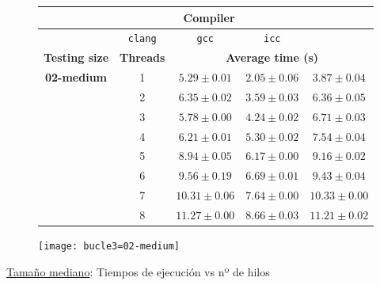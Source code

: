 \begin{figure}[H]
    \centering
    \begin{subfigure}{0.4\textwidth}
        \begin{adjustbox}{width=\textwidth} 
        \begin{tabular}{|c|c|c|c|c|}
            \hline
            \rowcolor{azul} \multicolumn{2}{|c|}{}&\multicolumn{3}{c|}{\textbf{Compiler}} \\ \hline
            \rowcolor{azul} \multicolumn{2}{|c|}{}&\texttt{clang}&\texttt{gcc}&\texttt{icc}\\ \hline
            \rowcolor{azul} \textbf{Testing size} & \textbf{Threads}&\multicolumn{3}{c|}{\textbf{Average time (s)}} \\ \hline
            \multirow{8}{2.5cm}{\textbf{02-medium}} & 1 & \(5.29\pm{0.01}\) & \(2.05\pm{0.06}\) & \(3.87\pm{0.04}\) \\ \cline{2-5}
            & 2 & \(6.35\pm{0.02}\) & \(3.59\pm{0.03}\) & \(6.36\pm{0.05}\) \\ \cline{2-5}
            & 3 & \(5.78\pm{0.00}\) & \(4.24\pm{0.02}\) & \(6.71\pm{0.03}\) \\ \cline{2-5}
            & 4 & \(6.21\pm{0.01}\) & \(5.30\pm{0.02}\) & \(7.54\pm{0.04}\) \\ \cline{2-5}
            & 5 & \(8.94\pm{0.05}\) & \(6.17\pm{0.00}\) & \(9.16\pm{0.02}\) \\ \cline{2-5}
            & 6 & \(9.56\pm{0.19}\) & \(6.69\pm{0.01}\) & \(9.43\pm{0.04}\) \\ \cline{2-5}
            & 7 & \(10.31\pm{0.06}\) & \(7.64\pm{0.00}\) & \(10.33\pm{0.00}\) \\ \cline{2-5}
            & 8 & \(11.27\pm{0.00}\) & \(8.66\pm{0.03}\) & \(11.21\pm{0.02}\) \\ \hline
        \end{tabular}
        \end{adjustbox}
    \end{subfigure}
    \hfill
    \begin{subfigure}{0.5\textwidth}
        \texttt{[image: bucle3=02-medium]}
    \end{subfigure}
    \caption{\underline{Tamaño mediano}: Tiempos de ejecución vs nº de hilos}
    \label{bucle3=02-medium}
\end{figure}

